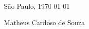 \documentclass[10pt,A4,english]{article}
\newcommand{\mpwidth}{\linewidth-\fboxsep-\fboxsep}
\newcommand{\cvtext}[1] {
	\begin{tabular*}{1\mpwidth}{p{0.98\mpwidth}}
		\parbox{1\mpwidth}{#1}
	\end{tabular*}
}
\newcommand{\cvsection}[1] {
	\vspace{14pt}
	\cvtext{
		\textbf{\LARGE{\textcolor{darkcol}{#1}}}\\[-4pt]
		\textcolor{accentcol}{ \rule{0.2\textwidth}{1.5pt} } \\
	}
}
\newcommand{\cvevent}[7] {
	
	\parbox{\mpwidth}{
		\begin{tabular*}{1\mpwidth}{p{0.66\mpwidth}  r}
	 		\textcolor{black}{\textbf{#2}} & \colorbox{accentcol}{\makebox[0.32\mpwidth]{\textcolor{white}{\textbf{#1}}}} \\
			\textcolor{maincol}{#3} & \\
		\end{tabular*}\\[8pt]
	
		\ifthenelse{\isempty{#4}}{}{
			\cvtext{#4}\\
		}
	}
	\vspace{14pt}
}
\begin{document}
\begin{paracol}{2}
\begin{rightcolumn}





\mbox{}
\vfill
\mbox{}
\vfill
\mbox{}
\vfill
\mbox{}
\vfill
\mbox{}
\vfill
\mbox{}
\vfill
\mbox{}
\vfill
\mbox{}
\vfill
\mbox{}
\vfill
\mbox{}
\vfill
\mbox{}


São Paulo, \today \hspace{1cm} \hrulefill

\hspace*{30mm}\phantom{Lorem, \today }Matheus Cardoso de Souza

\end{rightcolumn}
\end{paracol}
\end{document}
